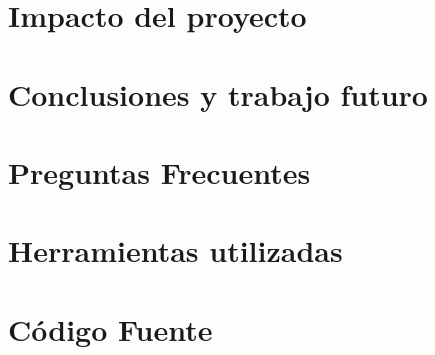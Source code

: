\chapter{Impacto del proyecto}
\label{sec:cap5}


\chapter{Conclusiones y trabajo futuro}
\label{sec:cap6}



\label{sec:bibliografía}
\printbibliography

\appendix
\label{sec:apendice}
\chapter{Preguntas Frecuentes}

\chapter{Herramientas utilizadas}

\chapter{Código Fuente}
\label{sec:codigofuente}


